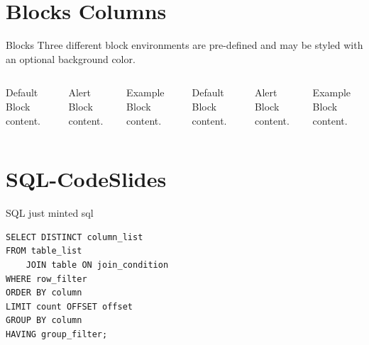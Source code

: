 \section{Blocks Columns}
\begin{frame}{Blocks}
  Three different block environments are pre-defined and may be styled with an
  optional background color.

  \begin{columns}[T,onlytextwidth]
      \begin{block}{Default}
        Block content.
      \end{block}

      \begin{alertblock}{Alert}
        Block content.
      \end{alertblock}

      \begin{exampleblock}{Example}
        Block content.
      \end{exampleblock}



      \begin{block}{Default}
        Block content.
      \end{block}

      \begin{alertblock}{Alert}
        Block content.
      \end{alertblock}

      \begin{exampleblock}{Example}
        Block content.
      \end{exampleblock}

  \end{columns}
\end{frame}

\section{SQL-CodeSlides}
\begin{frame}[fragile]{SQL}
just minted sql
\begin{verbatim}
SELECT DISTINCT column_list
FROM table_list
    JOIN table ON join_condition
WHERE row_filter
ORDER BY column
LIMIT count OFFSET offset
GROUP BY column
HAVING group_filter;
\end{verbatim}
\end{frame}


